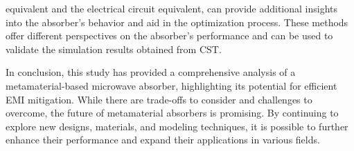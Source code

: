     equivalent and the electrical circuit equivalent, can provide additional insights into
    the absorber's behavior and aid in the optimization process. These methods offer
    different perspectives on the absorber's performance and can be used to validate the
    simulation results obtained from CST.
    \par In conclusion, this study has provided a comprehensive analysis of a
    metamaterial-based microwave absorber, highlighting its potential for efficient EMI
    mitigation. While there are trade-offs to consider and challenges to overcome, the
    future of metamaterial absorbers is promising. By continuing to explore new designs,
    materials, and modeling techniques, it is possible to further enhance their
    performance and expand their applications in various fields.